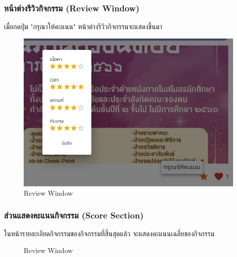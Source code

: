 \subsubsection{หน้าต่างรีวิวกิจกรรม (Review Window)}
เมื่อกดปุ่ม "กรุณาให้คะแนน" หน้าต่างรีวิวกิจกรรมจะแสดงขึ้นมา
\begin{figure}[H]
\begin{center}
\includegraphics[scale=0.8]{public/act-review.jpg}
\end{center}
\caption[Poem]{Review Window}
\label{fig:review-window}
\end{figure}
\subsubsection{ส่วนแสดงคะแนนกิจกรรม (Score Section)}
ในหน้ารายละเอียดกิจกรรมของกิจกรรมที่สิ้นสุดแล้ว จะแสดงคะแนนเฉลี่ยของกิจกรรม
\begin{figure}[H]
\begin{center}
\end{center}
\caption[Poem]{Review Window}
\label{fig:score-section}
\end{figure}



